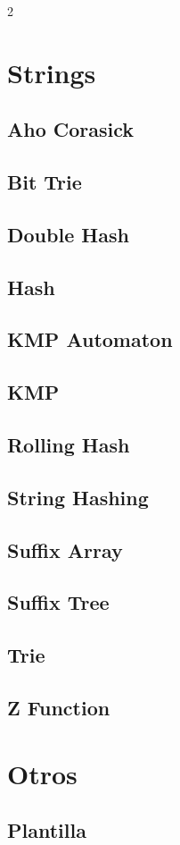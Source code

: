 \documentclass[a4paper,landscape,10pt]{article}
\begin{document}
\begin{multicols*}{2}
\section{Strings}
\subsection{Aho Corasick}

\subsection{Bit Trie}

\subsection{Double Hash}

\subsection{Hash}

\subsection{KMP Automaton}

\subsection{KMP}

\subsection{Rolling Hash}

\subsection{String Hashing}

\subsection{Suffix Array}

\subsection{Suffix Tree}

\subsection{Trie}

\subsection{Z Function}

\section{Otros}
\subsection{Plantilla}

\end{multicols*}
\end{document}
